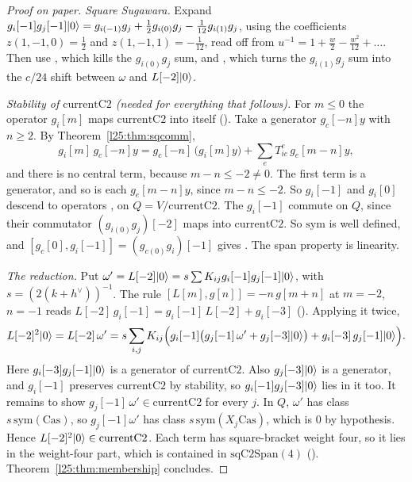 \begin{proof}[Proof on paper]
\emph{Square Sugawara.} Expand $g_i[-1]g_j[-1]|0\rangle=g_{i(-1)}g_j+\frac12g_{i(0)}g_j-\frac1{12}g_{i(1)}g_j$,
using the coefficients $z(1,-1,0)=\frac12$ and $z(1,-1,1)=-\frac1{12}$, read off from
$u^{-1}=1+\frac w2-\frac{w^2}{12}+\dots$. Then use , which kills the $g_{i(0)}g_j$ sum, and , which
turns the $g_{i(1)}g_j$ sum into the $c/24$ shift between $\omega$ and $L[-2]|0\rangle$.

\emph{Stability of $\mathrm{currentC2}$ (needed for everything that follows).} For $m\le0$ the operator $g_i[m]$ maps
$\mathrm{currentC2}$ into itself (). Take a generator $g_c[-n]y$ with $n\ge2$. By
Theorem~\ref{l25:thm:sqcomm},
\begin{equation*}
g_i[m]\,g_c[-n]y=g_c[-n]\,\big(g_i[m]y\big)+\sum_eT_{ic}^e\,g_e[m-n]y ,
\end{equation*}
and there is no central term, because $m-n\le-2\ne0$. The first term is a generator, and so is each $g_e[m-n]y$, since
$m-n\le-2$. So $g_i[-1]$ and $g_i[0]$ descend to operators ,  on $Q=V/\mathrm{currentC2}$.
The $g_i[-1]$ commute on $Q$, since their commutator $(g_{i(0)}g_j)[-2]$ maps into $\mathrm{currentC2}$. So
$\mathrm{sym}$ is well defined, and $[g_c[0],g_i[-1]]=(g_{c(0)}g_i)[-1]$ gives . The span property is
linearity.

\emph{The reduction.} Put $\omega'=L[-2]|0\rangle=s\sum K_{ij}g_i[-1]g_j[-1]|0\rangle$, with
$s=(2(k+h^\vee))^{-1}$. The rule $[L[m],g[n]]=-n\,g[m+n]$ at $m=-2$, $n=-1$ reads
$L[-2]\,g_i[-1]=g_i[-1]\,L[-2]+g_i[-3]$ (). Applying it twice,
\begin{equation*}
L[-2]^2|0\rangle=L[-2]\,\omega'=s\sum_{i,j}K_{ij}\Big(g_i[-1]\big(g_j[-1]\,\omega'+g_j[-3]|0\rangle\big)
+g_i[-3]\,g_j[-1]|0\rangle\Big).
\end{equation*}
Here $g_i[-3]g_j[-1]|0\rangle$ is a generator of $\mathrm{currentC2}$. Also $g_j[-3]|0\rangle$ is a
generator, and $g_i[-1]$ preserves $\mathrm{currentC2}$ by stability, so $g_i[-1]g_j[-3]|0\rangle$ lies in it too.
It remains to show $g_j[-1]\,\omega'\in\mathrm{currentC2}$ for every $j$. In $Q$, $\omega'$ has class
$s\,\mathrm{sym}(\mathrm{Cas})$, so $g_j[-1]\omega'$ has class $s\,\mathrm{sym}(X_j\mathrm{Cas})$, which is $0$ by
hypothesis. Hence $L[-2]^2|0\rangle\in\mathrm{currentC2}$. Each term has square-bracket weight four, so it lies in
the weight-four part, which is contained in $\mathrm{sqC2Span}(4)$ ().
Theorem~\ref{l25:thm:membership} concludes.
\end{proof}
